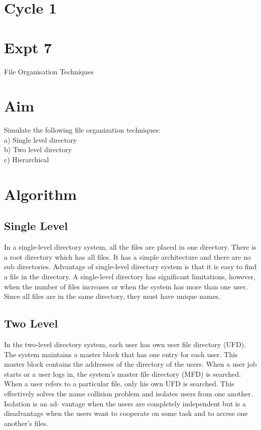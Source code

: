 \documentclass[13pt,oneside]{book}
\begin{document}
\section*{Cycle 1}
\section*{Expt 7}
\begin{center}
    \Large{File Organisation Techniques}
\end{center}
\section*{Aim}
\large
Simulate the following file organization techniques:\\
 a) Single level directory\\
 b) Two level directory\\
 c) Hierarchical\\
\section*{Algorithm} 
\subsection{Single Level}
In a single-level directory system, all the files are placed in one directory. There
is a root directory which has all files. It has a simple architecture and there are no
sub directories. Advantage of single-level directory system is that it is easy to find
a file in the directory. A single-level directory has significant limitations, however,
when the number of files increases or when the system has more than one user. Since
all files are in the same directory, they must have unique names.
\subsection{Two Level}
In the two-level directory system, each user has own user file directory (UFD).
The system maintains a master block that has one entry for each user. This master
block contains the addresses of the directory of the users. When a user job starts
or a user logs in, the system’s master file directory (MFD) is searched. When a
user refers to a particular file, only his own UFD is searched. This effectively solves
the name collision problem and isolates users from one another. Isolation is an ad-
vantage when the users are completely independent but is a disadvantage when the
users want to cooperate on some task and to access one another’s files.
\end{document}
